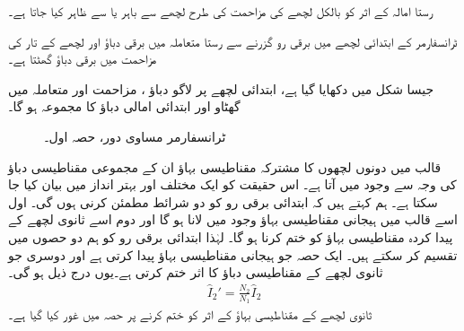 رستا امالہ کے اثر کو بالکل لچھے کی مزاحمت کی طرح لچھے سے باہر   یا    سے ظاہر کیا جاتا ہے۔

ٹرانسفارمر کے ابتدائی لچھے میں برقی رو   گزرنے سے رستا متعاملہ میں  برقی دباؤ اور لچھے کے تار کی مزاحمت  میں  برقی دباؤ گھٹتا ہے۔

جیسا شکل   میں دکھایا گیا ہے، ابتدائی لچھے  پر لاگو دباؤ ،   مزاحمت  اور متعاملہ    میں گھٹاو اور  ابتدائی امالی دباؤ  کا مجموعہ  ہو گا۔  
\begin{figure}
\centering
\caption{ٹرانسفارمر مساوی دور، حصہ اول۔}
\label{شکل_ٹرانسفارمر_ماڈل_حصہ_اول}
\end{figure}
%

قالب میں دونوں لچھوں کا مشترکہ مقناطیسی بہاؤ ان کے مجموعی مقناطیسی دباؤ کی وجہ سے وجود میں آتا ہے۔ اس حقیقت  کو ایک مختلف اور بہتر انداز میں بیان کیا جا سکتا ہے۔ ہم کہتے ہیں کہ ابتدائی برقی رو کو دو شرائط مطمئن کرنی  ہوں گی۔ اول اسے قالب میں ہیجانی مقناطیسی بہاؤ وجود میں لانا ہو گا اور دوم اسے ثانوی لچھے کے پیدا کردہ مقناطیسی بہاؤ کو ختم کرنا ہو گا۔ لہٰذا ابتدائی برقی رو کو ہم دو حصوں میں تقسیم کر سکتے ہیں۔ ایک حصہ  جو ہیجانی مقناطیسی بہاؤ پیدا کرتی ہے اور دوسری  جو ثانوی لچھے کے مقناطیسی دباؤ کا اثر  ختم کرتی ہے۔یوں  درج ذیل ہو گی۔
\begin{align}
\hat{I}_2'=\frac{N_2}{N_1} \hat{I}_2
\end{align}
 ثانوی لچھے کے مقناطیسی بہاؤ کے اثر کو ختم کرنے پر حصہ   میں غور کیا گیا ہے۔

